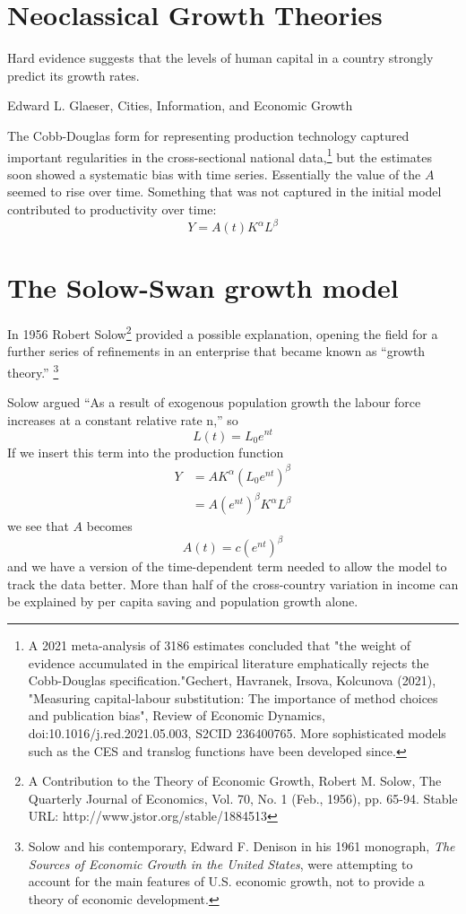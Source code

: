 \section{Neoclassical Growth Theories} 

\label{section-growth}
\epigraph{Hard evidence suggests that the levels of human capital in a country strongly predict its growth rates.}{Edward L. Glaeser, Cities, Information, and Economic Growth}

The \gls{Cobb-Douglas} form for representing production technology captured  important regularities in the cross-sectional national data,\footnote{ A 2021 meta-analysis of 3186 estimates concluded that "the weight of evidence accumulated in the empirical literature emphatically rejects the Cobb-Douglas specification."Gechert, Havranek, Irsova, Kolcunova (2021), "Measuring capital-labour substitution: The importance of method choices and publication bias", Review of Economic Dynamics, doi:10.1016/j.red.2021.05.003, S2CID 236400765. More sophisticated models  such as the CES and translog functions have been developed  since.} 
but the estimates soon showed a systematic bias with time series. Essentially the value of the $A$ seemed to rise over time. Something that was not captured in the initial model  contributed to productivity over time: 
 \[Y=A(t)K^\alpha L^\beta\]


 \section{The Solow-Swan growth model}
In 1956 Robert Solow\footnote{A Contribution to the Theory of Economic Growth,  Robert M. Solow, The Quarterly Journal of Economics, Vol. 70, No. 1 (Feb., 1956), pp. 65-94. Stable URL: http://www.jstor.org/stable/1884513} provided a possible explanation, opening the field for a further series of refinements in an enterprise that became known as ``growth theory.''
\footnote{Solow and his contemporary, Edward F. Denison in his 1961 monograph, \textit{The Sources of Economic Growth in the United States}, were attempting to account for the main features of U.S. economic growth, not to provide a theory of economic development.}%

Solow argued ``As a result of exogenous population growth the labour force increases at a constant relative rate n,'' so
  \[L(t)= L_0e^{nt}\] 
If we insert this term into the production function 
\begin{eqnarray}
Y &= AK^\alpha (L_0e^{nt})^\beta\nonumber\\
  &= A(e^{nt})^{\beta}K^\alpha L^\beta
\label{eqn-solow-swan3}
\end{eqnarray}
we see that $A$ becomes
 \[A(t)=c(e^{nt})^\beta\]
and we have a version of the time-dependent term needed to  allow the model to track the data better. More than half  of the cross-country variation in income can be explained by per capita saving and population growth alone.



